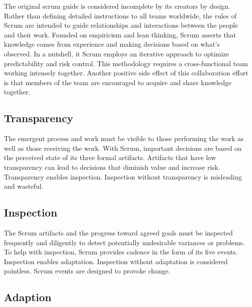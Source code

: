 \begin{flushleft}
	The original scrum guide is considered incomplete by its creators by design.
	Rather than defining detailed instructions to all teams worldwide, the rules
	of Scrum are intended to guide relationships and interactions between the people
	and their work. Founded on empiricism and lean thinking, Scrum asserts that
	knowledge comes from experience and making decisions based on what's observed.
	In a nutshell, it Scrum employs an iterative approach to optimize predictability
	and risk control. This methodology requires a cross-functional team working
	intensely together. Another positive side effect of this collaboration effort
	is that members of the team are encouraged to acquire and share knowledge together.
\end{flushleft}

\subsection{Transparency}\label{scrum-transparency}

\begin{flushleft}
	The emergent process and work must be visible to those performing the work
	as well as those receiving the work. With Scrum, important decisions are based
	on the perceived state of its three formal artifacts. Artifacts that have low
	transparency can lead to decisions that diminish value and increase risk.
	Transparency enables inspection. Inspection without transparency is misleading
	and wasteful.
\end{flushleft}

\subsection{Inspection}\label{scrum-inspection}

\begin{flushleft}
	The Scrum artifacts and the progress toward agreed goals must be inspected
	frequently and diligently to detect potentially undesirable variances or problems.
	To help with inspection, Scrum provides cadence in the form of its five events.
	Inspection enables adaptation. Inspection without adaptation is considered pointless.
	Scrum events are designed to provoke change.
\end{flushleft}

\subsection{Adaption}\label{scrum-adaption}

